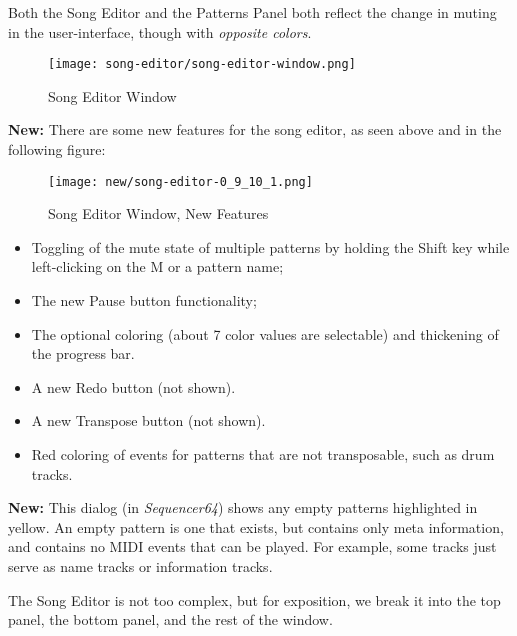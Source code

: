    Both the Song Editor and the Patterns Panel both reflect the change in
   muting in the user-interface, though with \textsl{opposite colors}.

\begin{figure}[H]
   \centering 
   \texttt{[image: song-editor/song-editor-window.png]}
   \caption{Song Editor Window}
   \label{fig:song_editor_window}
\end{figure}

   \textbf{New:}
   There are some new features for the song editor, as
   seen above and in the following figure:

\begin{figure}[H]
   \centering 
   \texttt{[image: new/song-editor-0\_9\_10\_1.png]}
   \caption{Song Editor Window, New Features}
   \label{fig:song_editor_window_new_features}
\end{figure}

   \begin{itemize}
      \item Toggling of the mute state of multiple patterns by holding the
         Shift key while left-clicking on the M or a pattern name;
      \item The new Pause button functionality;
      \item The optional coloring (about 7 color values are selectable)
         and thickening of the progress bar.
      \item A new Redo button (not shown).
      \item A new Transpose button (not shown).
      \item Red coloring of events for patterns that are not transposable, such
         as drum tracks.
   \end{itemize}

   \textbf{New:} 
   This dialog (in \textsl{Sequencer64}) shows any empty patterns
   highlighted in yellow.  An empty pattern is one that exists, but
   contains only meta information, and contains no MIDI events that
   can be played.  For example, some tracks just serve as name tracks or
   information tracks.
   
   The Song Editor is not too complex, but for exposition, we break it into
   the top panel, the bottom panel, and the rest of the window.

